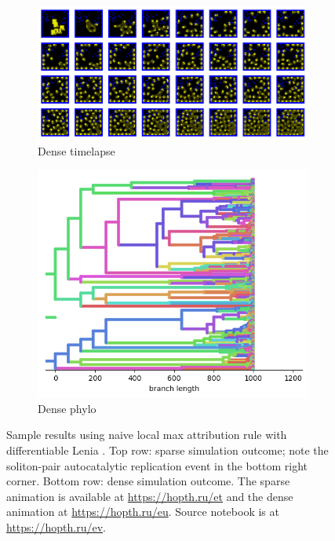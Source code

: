 \begin{figure}[htbp]
  \begin{subfigure}[b]{0.65\textwidth}
    \centering
    \includegraphics[width=\textwidth]{img/dev-timelapse-dense.png}
    \caption{Dense timelapse}
    \label{fig:dev-sample:dev-timelapse-dense}
  \end{subfigure}%
  \hfill
  \begin{subfigure}[b]{0.35\textwidth}
    \centering
    \includegraphics[width=\textwidth]{img/dev-phylo-dense.png}
    \caption{Dense phylo}
    \label{fig:dev-sample:dev-phylo-dense}
  \end{subfigure}

  \caption{Sample results using naive local max attribution rule with differentiable Lenia \citep{hamon2022learning}.
  Top row: sparse simulation outcome; note the soliton-pair autocatalytic replication event in the bottom right corner.
  Bottom row: dense simulation outcome.
  The sparse animation is available at \url{https://hopth.ru/et} and the dense animation at \url{https://hopth.ru/eu}.
  Source notebook is at \url{https://hopth.ru/ev}.
}
  \label{fig:dev-sample}
\end{figure}
